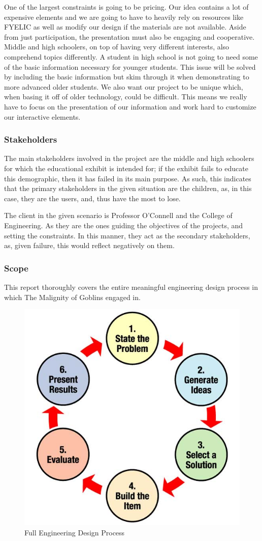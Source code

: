 \documentclass[conference]{IEEEtran}
\begin{document}
\par One of the largest constraints is going to be pricing. Our idea contains a lot of expensive elements and we are going to have to heavily rely on resources like FYELIC as well as modify our design if the materials are not available. Aside from just participation, the presentation must also be engaging and cooperative. Middle and high schoolers, on top of having very different interests, also comprehend topics differently. A student in high school is not going to need some of the basic information necessary for younger students. This issue will be solved by including the basic information but skim through it when demonstrating to more advanced older students. We also want our project to be unique which, when basing it off of older technology, could be difficult. This means we really have to focus on the presentation of our information and work hard to customize our interactive elements.

\subsubsection{Stakeholders}

\par The main stakeholders involved in the project are the middle and high schoolers for which the educational exhibit is intended for; if the exhibit fails to educate this demographic, then it has failed in its main purpose. As such, this indicates that the primary stakeholders in the given situation are the children, as, in this case, they are the users, and, thus have the most to lose.
\par The client in the given scenario is Professor O'Connell and the College of Engineering. As they are the ones guiding the objectives of the projects, and setting the constraints. In this manner, they act as the secondary stakeholders, as, given failure, this would reflect negatively on them.

\subsubsection{Scope}

\par This report thoroughly covers the entire meaningful engineering design process in which The Malignity of Goblins engaged in.

\begin{figure}[H]
  \centering
  \includegraphics[width=.45\textwidth]{Figures/EDP.jpg}
  \caption{Full Engineering Design Process}
  \label{fig:1}
\end{figure}
\end{document}
